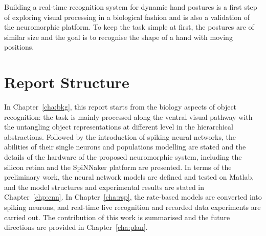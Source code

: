 Building a real-time recognition system for dynamic hand postures is a first step of exploring visual processing in a biological fashion and is also a validation of the neuromorphic platform.
To keep the task simple at first, the postures are of similar size and the goal is to recognise the shape of a hand with moving positions.
\section{Report Structure}
\label{sec:str}
In Chapter~\ref{cha:bkg}, this report starts from the biology aspects of object recognition: the task is mainly processed along the ventral visual pathway with the untangling object representations at different level in the hierarchical abstractions.
Followed by the introduction of spiking neural networks, the abilities of their single neurons and populations modelling are stated and the details of the hardware of the proposed neuromorphic system, including the silicon retina and the SpiNNaker platform are presented.
In terms of the preliminary work, the neural network models are defined and tested on Matlab, and the model structures and experimental results are stated in Chapter~\ref{chp:cnn}.
In Chapter~\ref{cha:rsp}, the rate-based models are converted into spiking neurons, and real-time live recognition and recorded data experiments are carried out.
The contribution of this work is summarised and the future directions are provided in Chapter~\ref{cha:plan}.
